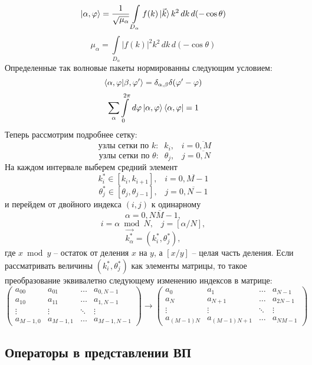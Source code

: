 \documentclass[a4paper,12pt]{article}
\begin{document}
\[
	\ket{\alpha,\varphi} = \frac{1}{\sqrt{\mu_\alpha}} \int\limits_{D_\alpha} f(k) \ket{\vec{k}} k^2 \,dk \,d(-\cos\theta)
\]
\[
	\mu_\alpha =  \int\limits_{D_\alpha} |f(k)|^2 k^2 \,dk \,d(-\cos\theta)
\]
Определенные так волновые пакеты нормированны следующим условием:
\[
	\braket{\alpha,\varphi|\beta,\varphi'} = \delta_{\alpha,\beta}\delta(\varphi'-\varphi)
\]\[
	\sum\limits_\alpha \int\limits_0^{2\pi} \,d \varphi \ket{\alpha,\varphi}\bra{\alpha,\varphi} = 1
\]
Теперь рассмотрим подробнее сетку:
\[
 \text{ узлы сетки по }k: \;\; k_i, \;\;\; i=\overline{0,M}
\]\[
 \text{ узлы сетки по }\theta: \;\;  \theta_j, \;\;\; j=\overline{0,N}
\]
На каждом интервале выберем средний элемент
\[
 k_i^* \in [k_i,k_{i+1}], \;\;\; i=\overline{0,M-1}
\]\[
 \theta_j^* \in [\theta_j,\theta_{j-1}], \;\;\; j=\overline{0,N-1}
\]
и перейдем от двойного индекса $(i,j)$ к одинарному
\[
	\alpha = \overline{0,N M-1},
\]\[
	i = \alpha \bmod N, \;\;\; j = [\alpha/N],
\]\[
	\vec{k^*_\alpha} = (k_i^*,\theta_j^*),
\]
где $x \bmod y$ – остаток от деления $x$ на $y$, а $[x/y]$ – целая часть деления. Если рассматривать величины $(k_i^*,\theta_j^*)$ как элементы матрицы, то такое преобразование эквивалетно следующему изменению индексов в матрице:
\[
\begin{pmatrix} 
a_{00}    & a_{01}    & \dots  & a_{0,N-1}  \\ 
a_{10}    & a_{11}    & \dots  & a_{1,N-1}  \\ 
\vdots    & \vdots    & \ddots & \vdots     \\ 
a_{M-1,0} & a_{M-1,1} & \dots  & a_{M-1,N-1}  
\end{pmatrix}  \longrightarrow  \begin{pmatrix} 
a_{0}      & a_{1}        & \dots   & a_{N-1}  \\  
a_{N}      & a_{N+1}      & \dots   & a_{2N-1} \\ 
\vdots     & \vdots       & \ddots  & \vdots   \\
a_{(M-1)N} & a_{(M-1)N+1} & \dots   & a_{NM-1} 
\end{pmatrix}
\]

\subsection{Операторы в представлении ВП}
\end{document}
